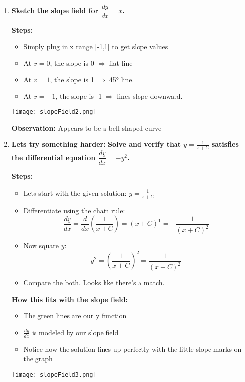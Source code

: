 \documentclass{article}
\begin{document}
\begin{enumerate}
  \item \textbf{Sketch the slope field for \( \dfrac{dy}{dx} = x \).}

    \textbf{Steps:}
    \begin{itemize}
      \item Simply plug in x range [-1,1] to get slope values
      \item At \(x = 0\), the slope is 0 \(\Rightarrow\) flat line
      \item At \(x = 1\), the slope is 1 \(\Rightarrow\) 45° line.
      \item At \(x = -1\), the slope is -1 \(\Rightarrow\) lines slope downward.
    \end{itemize}


  \begin{center}
      \vspace{0.3cm}
      \texttt{[image: slopeField2.png]}
      \vspace{0.3cm}
  \end{center}

  \textbf{Observation:} Appears to be a bell shaped curve

  \bigskip

\item \textbf{Lets try something harder: Solve and verify that \( y = \frac{1}{x + C} \) satisfies the differential equation \( \dfrac{dy}{dx} = -y^2 \).}

\textbf{Steps:}
\begin{itemize}
  \item Lets start with the given solution: \( y = \frac{1}{x + C} \)
  \item Differentiate using the chain rule:
  \[
  \frac{dy}{dx} = \frac{d}{dx}\left(\frac{1}{x + C}\right) = (x+C)^1= -\frac{1}{(x + C)^2}
  \]
  \item Now square \( y \):
  \[
  y^2 = \left(\frac{1}{x + C}\right)^2 = \frac{1}{(x + C)^2}
  \]
  \item Compare the both. Looks like there's a match.
\end{itemize}

\vspace{0.3cm}
\newpage
\textbf{How this fits with the slope field:}
\begin{itemize}
  \item The green lines are our y function 
  \item \(\frac{dy}{dx}\) is modeled by our slope field
  \item Notice how the solution lines up perfectly with the little slope marks on the graph
\end{itemize}

\begin{center}
\vspace{0.3cm}
\texttt{[image: slopeField3.png]}
\vspace{0.3cm}
\end{center}

\end{enumerate}
\end{document}
